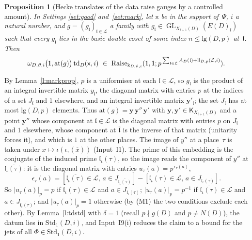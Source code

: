 \documentclass[11pt,a4paper]{article}
\makeatletter
\theoremstyle{plainx}
\newtheorem{proposition}[theorem]{Proposition}
\theoremstyle{uprightx}
\renewenvironment{proof}[1][Proof]{\par\pushQED{\qed}\normalfont\topsep0pt\partopsep0pt
  \trivlist\item[\hskip\labelsep\itshape #1.]\ignorespaces}{\popQED\endtrivlist\@endpefalse}
\newcommand{\cj}[1]{\overline{#1}}
\newcommand{\GL}{\operatorname{GL}}
\newcommand{\ED}[1]{E(#1)}
\newcommand{\emb}[1]{\iota_{#1}}
\newcommand{\ND}[1]{N(#1)}
\newcommand{\gD}[1]{g(#1)}
\newcommand{\XD}[2]{X_{#2}(#1)}
\newcommand{\rr}[2]{\mathrm{lg}(#1,#2)}
\newcommand{\Std}[2]{\mathrm{Std}_{#1}(#2)}
\newcommand{\raises}[4]{\mathrm{Raise}_{#1}(#2,#3;#4)}
\newcommand{\td}[3]{\mathrm{td}_{#1}(#2,#3)}
\newcommand{\lk}[3]{\mathrm{k}_{#1,#2,#3}}
\newcommand{\lkom}[3]{\omega_{#1,#2,#3}}
\newcommand{\ind}[1]{\mathfrak{l}_{\iota}(#1)}
\newcommand{\mexp}[2]{A_{#1}(#2)}
\newcommand{\Kf}[1]{\mathsf{K}_{#1}}
\makeatother
\begin{document}
\begin{proposition}[Hecke translates of the data raise gauges by a controlled amount]\label{p:raise}
In Settings \ref{set:good} and~\ref{set:mark}, let $\mathsf{x}$ be in the support of~$\Psi$, $i$ a natural
number, and $g=(g_{\mathfrak{l}})_{\mathfrak{l}\in\mathcal{L}}$ a family with
$g_{\mathfrak{l}}\in\GL_{\XD{D}{i+1}}(\ED{D}_{\mathfrak{l}})$ such that every $g_{\mathfrak{l}}$ lies in the basic
double coset of some index $n\le\rr{D}{p}$ at~$\mathfrak{l}$. Then
\[\lkom{D}{\vartheta}{i}\bigl(1,\mathrm{at}(g)\bigr)\,\td{D}{\mathsf{x}}{i}\ \in\ \raises{\lk{D}{\vartheta}{i}}{1}{1}{p^{\,\sum_{\mathfrak{l}\in\mathcal{L}}\mexp{D}{\mathfrak{l}}+\liftloss{\mathcal{L}}{i}}}.\]
\end{proposition}
\begin{proof}
By Lemma~\ref{l:markprop}, $p$ is a uniformiser at each $\mathfrak{l}\in\mathcal{L}$, so $g_{\mathfrak{l}}$ is the product of an integral invertible matrix $y_{\mathfrak{l}}$, the diagonal matrix
with entries $p$ at the indices of a set $J_{\mathfrak{l}}$ and $1$ elsewhere, and an integral invertible matrix
$\mathbf{y}'_{\mathfrak{l}}$; the set $J_{\mathfrak{l}}$ has at most $\rr{D}{p}$ elements. Thus $\mathrm{at}(g)=\mathbf{y}\,\mathbf{y}''\,\mathbf{y}'$
with $\mathbf{y},\mathbf{y}'\in\Kf{\XD{D}{i+1}}$ and a point $\mathbf{y}''$ whose component at $\mathfrak{l}\in\mathcal{L}$ is the diagonal
matrix with entries $p$ on $J_{\mathfrak{l}}$ and $1$ elsewhere, whose component at $\cj{\mathfrak{l}}$ is the
inverse of that matrix (unitarity forces it), and which is $1$ at the other places. The image of $y''$ at a
place~$\tau$ is taken under $x\mapsto \iota(\emb{\tau}(\cj{x}))$ (Input~I1). The prime of this embedding is the
conjugate of the induced prime $\ind{\tau}$, so the image reads the component of $y''$ at $\cj{\ind{\tau}}$: it
is the diagonal matrix with entries $u_\tau(a)=p^{\,\epsilon_\tau(a)}$,
\[\epsilon_\tau(a)=[\cj{\ind{\tau}}\in\mathcal{L},\,a\in J_{\cj{\ind{\tau}}}]-[\ind{\tau}\in\mathcal{L},\,a\in J_{\ind{\tau}}] .\]
So $|u_\tau(a)|_p=p$ if $\ind{\tau}\in\mathcal{L}$ and $a\in J_{\ind{\tau}}$; $|u_\tau(a)|_p=p^{-1}$ if
$\cj{\ind{\tau}}\in\mathcal{L}$ and $a\in J_{\cj{\ind{\tau}}}$; and $|u_\tau(a)|_p=1$ otherwise (by (M1) the two
conditions exclude each other). By Lemma~\ref{l:tdstd} with $\delta=1$ (recall
$p\nmid\gD{D}$ and $p\ne\ND{D}$), the datum lies in $\Std{1}{D,i}$, and Input~I9(i) reduces the claim to a bound
for the jets of all $\Phi\in\Std{1}{D,i}$.


\end{proof}
\end{document}
